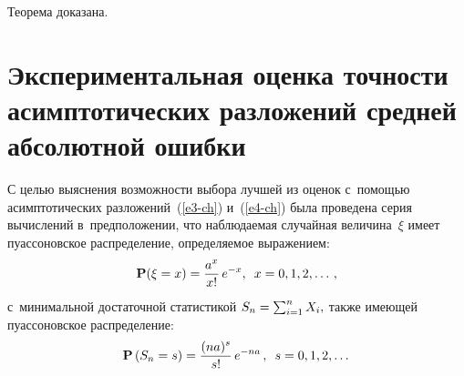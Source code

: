 \begin{multicols}{2}
   Теорема доказана.
   
   \vspace*{-9pt}

\section{Экспериментальная оценка точности асимптотических разложений средней 
абсолютной ошибки}

 С целью выяснения возможности выбора лучшей из оценок с~помощью 
 асимптотических разложений~(\ref{e3-ch}) и~(\ref{e4-ch}) 
 была проведена серия вычислений в~предположении, что наблюдаемая случайная 
 величина~$\xi$ имеет пуассоновское распределение, определяемое выражением:
  \begin{equation*}
 \mathbf{P}(\xi=x)=\displaystyle\frac{\displaystyle a^x\mathstrut}{\displaystyle x!\mathstrut}\,e^{-x},\enskip x=0,1,2,\dots\,,
 \end{equation*}
 с~минимальной достаточной статистикой $S_n\hm=\sum_{i=1}^n X_i,$ также 
 имеющей пуассоновское распределение:
 \begin{equation*}
 \mathbf{P}\left(S_n=s\right)=\displaystyle\frac{\displaystyle (n a)^s\mathstrut}{\displaystyle s!\mathstrut}\,e^{-n a}\,,\enskip s=0,1,2,\dots
 \end{equation*}
 
 


\end{multicols}
